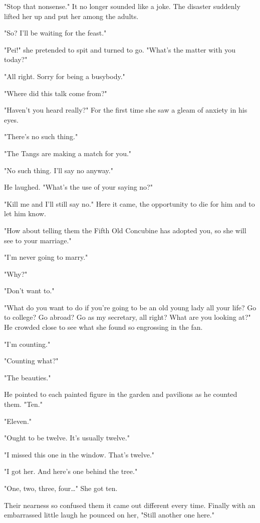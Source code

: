 \par "Stop that nonsense." It no longer sounded like a joke. The disaster suddenly lifted her up and put her among the adults.
\par "So? I'll be waiting for the feast."
\par "Pei!" she pretended to spit and turned to go. "What's the matter with you today?"
\par "All right. Sorry for being a busybody."
\par "Where did this talk come from?"
\par "Haven't you heard really?" For the first time she saw a gleam of anxiety in his eyes.
\par "There's no such thing."
\par "The Tangs are making a match for you."
\par "No such thing. I'll say no anyway."
\par He laughed. "What's the use of your saying no?"
\par "Kill me and I'll still say no." Here it came, the opportunity to die for him and to let him know.
\par "How about telling them the Fifth Old Concubine has adopted you, so she will see to your marriage."
\par "I'm never going to marry."
\par "Why?"
\par "Don't want to."
\par "What do you want to do if you're going to be an old young lady all your life? Go to college? Go abroad? Go as my secretary, all right? What are you looking at?" He crowded close to see what she found so engrossing in the fan.
\par "I'm counting."
\par "Counting what?"
\par "The beauties."
\par He pointed to each painted figure in the garden and pavilions as he counted them. "Ten."
\par "Eleven."
\par "Ought to be twelve. It's usually twelve."
\par "I missed this one in the window. That's twelve."
\par "I got her. And here's one behind the tree."
\par "One, two, three, four…" She got ten.
\par Their nearness so confused them it came out different every time. Finally with an embarrassed little laugh he pounced on her, "Still another one here."

